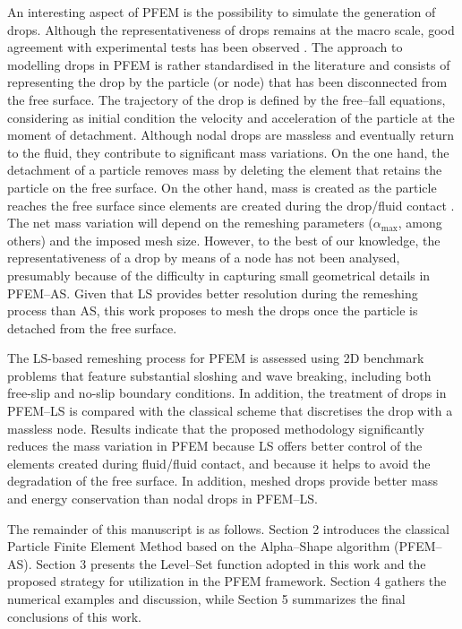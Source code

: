 \documentclass[final,3p,times]{elsarticle}
\newcommand{\EF}[1]{{\color{black}{#1}}}
\begin{document}
An interesting aspect of PFEM is the possibility to simulate the generation of drops. Although the representativeness of drops remains at the macro scale, good agreement with experimental tests has been observed \citep{idelsohn2004particle,cerquaglia2017free}. The approach to modelling drops \EF{at the macro scale} in PFEM is rather standardised in the literature and consists of representing the drop by the particle (or node) that has been disconnected from the free surface. The trajectory of the drop is defined by the free--fall equations, considering as initial condition the velocity and acceleration of the particle at the moment of detachment. Although nodal drops are massless and eventually return to the fluid, they contribute to significant mass variations. On the one hand, the detachment of a particle removes mass by deleting the element that retains the particle on the free surface. On the other hand, mass is created as the particle reaches the free surface since elements are created during the drop/fluid contact \citep{franci2017effect}. The net mass variation will depend on the remeshing parameters ($\alpha_\mathrm{max}$, among others) and the imposed mesh size. However, to the best of our knowledge, the representativeness of a drop by means of a node has not been analysed, presumably because of the difficulty in capturing small geometrical details in PFEM--AS. Given that LS provides better resolution during the remeshing process than AS, this work proposes to mesh the drops once the particle is detached from the free surface. 

The LS-based remeshing process for PFEM is assessed using 2D benchmark problems that feature substantial sloshing and wave breaking, including both free-slip and no-slip boundary conditions. In addition, the treatment of drops in PFEM--LS is compared with the classical scheme that discretises the drop with a massless node. Results indicate that the proposed methodology significantly reduces the mass variation in PFEM because LS offers better control of the elements created during fluid/fluid contact, and because it helps to avoid the degradation of the free surface. In addition, meshed drops provide better mass and energy conservation than nodal drops in PFEM--LS.


The remainder of this manuscript is as follows. Section 2 introduces the classical Particle Finite Element Method based on the Alpha--Shape algorithm (PFEM--AS). Section 3 presents the Level--Set function adopted in this work and the proposed strategy for utilization in the PFEM framework. Section 4 gathers the numerical examples and discussion, while Section 5 summarizes the final conclusions of this work.
\end{document}
